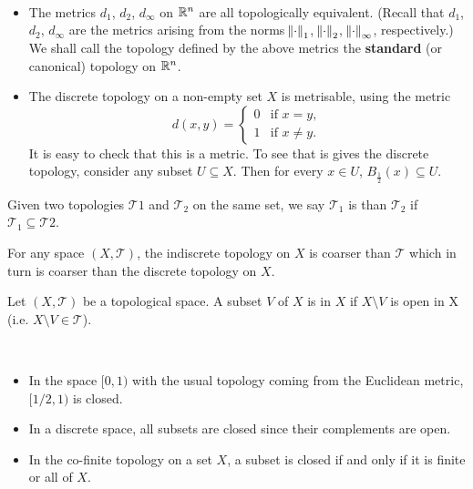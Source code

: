 \begin{example} \
\begin{itemize}
\item The metrics $d_1$, $d_2$, $d_\infty$ on $\mathbb R^n$ are all topologically equivalent. (Recall that $d_1$, $d_2$, $d_\infty$ are the metrics arising from the norms $\norm{\cdot}_1$, $\norm{\cdot}_2$, $\norm{\cdot}_\infty$, respectively.)
We shall call the topology defined by the above metrics the \textbf{standard} (or canonical) topology on $\mathbb R^n$.
\item The discrete topology on a non-empty set $X$ is metrisable, using the metric
\[d(x,y)=\begin{cases}
0&\text{if }x=y,\\
1&\text{if }x\neq y.
\end{cases}\]
It is easy to check that this is a metric. To see that is gives the discrete topology, consider any subset $U\subseteq X$. Then for every $x\in U$, $B_\frac{1}{2}(x)\subseteq U$.
\end{itemize}
\end{example}

\begin{definition}
Given two topologies $\mathcal{T}1$ and $\mathcal{T}_2$ on the same set, we say $\mathcal{T}_1$ is  than $\mathcal{T}_2$ if $\mathcal{T}_1\subseteq\mathcal{T}2$.
\end{definition}

\begin{remark}
For any space $(X,\mathcal{T})$, the indiscrete topology on $X$ is coarser than $\mathcal{T}$ which in turn is coarser than the discrete topology on $X$.
\end{remark}

\begin{definition}
Let $(X,\mathcal{T})$ be a topological space. A subset $V$ of $X$ is  in $X$ if $X\setminus V$ is open in X (i.e. $X\setminus V\in\mathcal{T}$).
\end{definition}

\begin{example} \
\begin{itemize}
\item In the space $[0,1)$ with the usual topology coming from the Euclidean metric, $[1/2,1)$ is closed.
\item In a discrete space, all subsets are closed since their complements are open.
\item In the co-finite topology on a set $X$, a subset is closed if and only if it is finite or all of $X$.
\end{itemize}
\end{example}


